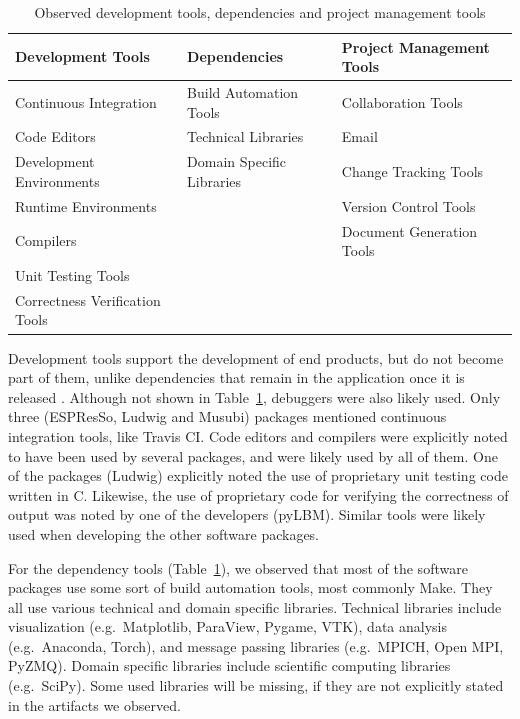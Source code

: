 \documentclass[final, 3p, times, authoryear]{elsarticle}
\begin{document}
\begin{table}
	\begin{center}
	\begin{tabular}{ p{5.3 cm} p{4.9 cm} p{5 cm}}
	\toprule
	\textbf{Development Tools} & \textbf{Dependencies} & \textbf{Project
	Management Tools} \\
	\midrule
	Continuous Integration & Build Automation Tools & Collaboration Tools\\
	Code Editors & Technical Libraries & Email\\
	Development Environments & Domain Specific Libraries & Change Tracking Tools\\
	Runtime Environments &  & Version Control Tools\\
	Compilers &  & Document Generation Tools\\
	Unit Testing Tools &  & \\
	Correctness Verification Tools &  & \\
	\bottomrule
	\end{tabular}
	\caption{Observed development tools, dependencies and project management
	tools} \label{tbl_tools}
	\end{center}
\end{table}

Development tools support the development of end products, but do not become
part of them, unlike dependencies that remain in the application once it is
released \citep{ghezzi1991fundamentals}. Although not shown in
Table~\ref{tbl_tools}, debuggers were also likely used.  Only three (ESPResSo,
Ludwig and Musubi) packages mentioned continuous integration tools, like Travis
CI. Code editors and compilers were explicitly noted to have been used by
several packages, and were likely used by all of them. One of the packages
(Ludwig) explicitly noted the use of proprietary unit testing code written in C.
Likewise, the use of proprietary code for verifying the correctness of output
was noted by one of the developers (pyLBM). Similar tools were likely used when
developing the other software packages.

For the dependency tools (Table~\ref{tbl_tools}), we observed that most of the
software packages use some sort of build automation tools, most commonly Make.
They all use various technical and domain specific libraries. Technical
libraries include visualization (e.g.\ Matplotlib, ParaView, Pygame, VTK), data
analysis (e.g.\ Anaconda, Torch), and message passing libraries (e.g.\ MPICH,
Open MPI, PyZMQ). Domain specific libraries include scientific computing
libraries (e.g.\ SciPy). Some used libraries will be missing, if they are not
explicitly stated in the artifacts we observed.
\end{document}
